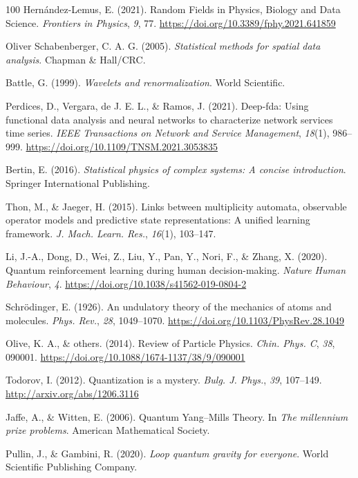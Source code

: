 \documentclass[11pt]{book}
\begin{document}
\begin{thebibliography}{100}
 Hernández-Lemus, E. (2021). Random Fields in Physics, Biology and Data
Science. \emph{Frontiers in Physics}, \emph{9}, 77.
\url{https://doi.org/10.3389/fphy.2021.641859}

 Oliver Schabenberger, C. A. G. (2005). \emph{Statistical methods for
spatial data analysis}. Chapman \& Hall/CRC.

 Battle, G. (1999). \emph{Wavelets and renormalization}. World
Scientific.

 Perdices, D., Vergara, de J. E. L., \& Ramos, J. (2021). Deep-fda: Using
functional data analysis and neural networks to characterize network
services time series. \emph{IEEE Transactions on Network and Service
Management}, \emph{18}(1), 986--999.
\url{https://doi.org/10.1109/TNSM.2021.3053835}

 Bertin, E. (2016). \emph{Statistical physics of complex systems: A
concise introduction}. Springer International Publishing.

 Thon, M., \& Jaeger, H. (2015). Links between multiplicity automata,
observable operator models and predictive state representations: A
unified learning framework. \emph{J. Mach. Learn. Res.}, \emph{16}(1),
103--147.

 Li, J.-A., Dong, D., Wei, Z., Liu, Y., Pan, Y., Nori, F., \& Zhang, X.
(2020). Quantum reinforcement learning during human decision-making.
\emph{Nature Human Behaviour}, \emph{4}.
\url{https://doi.org/10.1038/s41562-019-0804-2}

 Schrödinger, E. (1926). An undulatory theory of the mechanics of atoms
and molecules. \emph{Phys. Rev.}, \emph{28}, 1049--1070.
\url{https://doi.org/10.1103/PhysRev.28.1049}

 Olive, K. A., \& others. (2014). Review of Particle Physics. \emph{Chin.
Phys. C}, \emph{38}, 090001.
\url{https://doi.org/10.1088/1674-1137/38/9/090001}

 Todorov, I. (2012). Quantization is a mystery. \emph{Bulg. J. Phys.},
\emph{39}, 107--149. \url{http://arxiv.org/abs/1206.3116}

 Jaffe, A., \& Witten, E. (2006). Quantum Yang--Mills Theory. In
\emph{The millennium prize problems}. American Mathematical Society.

 Pullin, J., \& Gambini, R. (2020). \emph{Loop quantum gravity for
everyone}. World Scientific Publishing Company.


\end{thebibliography}
\end{document}
